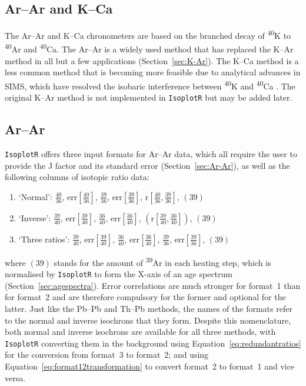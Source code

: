 \begin{refsection}

\chapter{Ar--Ar and K--Ca}\label{ch:ArArKCa}

The Ar--Ar and K--Ca chronometers are based on the branched decay of
\textsuperscript{40}K to \textsuperscript{40}Ar and
\textsuperscript{40}Ca. The Ar--Ar is a widely used method that has
replaced the K--Ar method in all but a few applications
(Section~\ref{sec:K-Ar}). The K--Ca method is a less common method
that is becoming more feasible due to analytical advances in SIMS,
which have resolved the isobaric interference between
\textsuperscript{40}K and \textsuperscript{40}Ca
\citep{harrison2010}. The original K--Ar method is not implemented in
\texttt{IsoplotR} but may be added later.

\section{Ar--Ar}\label{sec:ArAr}

\texttt{IsoplotR} offers three input formats for Ar--Ar data, which
all require the user to provide the J factor and its standard error
(Section~\ref{sec:Ar-Ar}), as well as the following columns of
isotopic ratio data:
\begin{enumerate}
\item{`Normal':}
  $\frac{40}{36}$,  
  $\mbox{err}\!\left[\frac{40}{36}\right]$, 
  $\frac{39}{36}$,  
  $\mbox{err}\!\left[\frac{39}{36}\right]$,  
  $\mbox{r}\!\left[\frac{40}{36},\frac{39}{36}\right]$,
  $\left(39\right)$
\item{`Inverse':}
  $\frac{39}{40}$,  
  $\mbox{err}\!\left[\frac{39}{40}\right]$, 
  $\frac{36}{40}$,  
  $\mbox{err}\!\left[\frac{36}{40}\right]$,  
  $\left(\mbox{r}\!\left[\frac{39}{40},\frac{36}{40}\right]\right)$,
  $\left(39\right)$
\item{`Three ratios':}
  $\frac{39}{40}$,  
  $\mbox{err}\!\left[\frac{39}{40}\right]$, 
  $\frac{36}{40}$,  
  $\mbox{err}\!\left[\frac{36}{40}\right]$,  
  $\frac{39}{36}$,  
  $\mbox{err}\!\left[\frac{39}{36}\right]$,
  $\left(39\right)$
\end{enumerate}

\noindent where $(39)$ stands for the amount of \textsuperscript{39}Ar
in each heating step, which is normalised by \texttt{IsoplotR} to form
the X-axis of an age spectrum (Section~\ref{sec:agespectra}). Error
correlations are much stronger for format~1 than for format~2 and are
therefore compulsory for the former and optional for the latter. Just
like the Pb--Pb and Th--Pb methods, the names of the formats refer to
the normal and inverse isochrons that they form. Despite this
nomenclature, both normal and inverse isochrons are available for all
three methods, with \texttt{IsoplotR} converting them in the
background using Equation~\ref{eq:redundantratios} for the conversion
from format~3 to format~2; and using
Equation~\ref{eq:format12transformation} to convert format~2 to
format~1 and vice versa.


\end{refsection}
